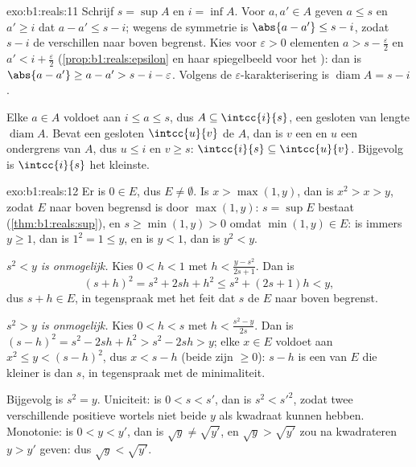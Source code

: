 \begin{solution}{exo:b1:reals:11}
Schrijf $s = \sup A$ en $i = \inf A$. Voor $a, a' \in A$ geven $a \leq s$
en $a' \geq i$ dat $a - a' \leq s - i$; wegens de symmetrie is $\abs{a -
a'} \leq s - i$, zodat $s - i$ de  verschillen naar boven
begrenst. Kies voor $\varepsilon > 0$ elementen $a > s -
\frac\varepsilon2$ en $a' < i + \frac\varepsilon2$
(\cref{prop:b1:reals:epsilon} en haar spiegelbeeld voor het ): dan
is $\abs{a - a'} \geq a - a' > s - i - \varepsilon$. Volgens de
$\varepsilon$-karakterisering is $\operatorname{diam} A = s - i$.

Elke $a \in A$ voldoet aan $i \leq a \leq s$, dus $A \subseteq
\intcc{i}{s}$, een gesloten  van lengte $\operatorname{diam} A$.
Bevat een gesloten  $\intcc{u}{v}$ de  $A$, dan is $v$
een  en $u$ een ondergrens van $A$, dus $u \leq i$ en $v \geq
s$: $\intcc{i}{s} \subseteq \intcc{u}{v}$. Bijgevolg is $\intcc{i}{s}$
het kleinste.
\end{solution}

\begin{solution}{exo:b1:reals:12}
Er is $0 \in E$, dus $E \neq \emptyset$. Is $x > \max(1, y)$, dan is $x^2
> x > y$, zodat $E$ naar boven begrensd is door $\max(1, y)$: $s = \sup
E$ bestaat (\cref{thm:b1:reals:sup}), en $s \geq \min(1, y) > 0$ omdat
$\min(1, y) \in E$: is immers $y \geq 1$, dan is $1^2 = 1 \leq y$, en is
$y < 1$, dan is $y^2 < y$.

\emph{$s^2 < y$ is onmogelijk.} Kies $0 < h < 1$ met $h < \frac{y -
s^2}{2s + 1}$. Dan is
\[
(s + h)^2 = s^2 + 2sh + h^2 \leq s^2 + (2s + 1)h < y ,
\]
dus $s + h \in E$, in tegenspraak met het feit dat $s$ de  $E$
naar boven begrenst.

\emph{$s^2 > y$ is onmogelijk.} Kies $0 < h < s$ met $h < \frac{s^2 -
y}{2s}$. Dan is $(s - h)^2 = s^2 - 2sh + h^2 > s^2 - 2sh > y$; elke $x
\in E$ voldoet aan $x^2 \leq y < (s - h)^2$, dus $x < s - h$ (beide zijn
$\geq 0$): $s - h$ is een  van $E$ die kleiner is dan $s$, in
tegenspraak met de minimaliteit.

Bijgevolg is $s^2 = y$. Uniciteit: is $0 < s < s'$, dan is $s^2 < s'^2$,
zodat twee verschillende positieve wortels niet beide $y$ als kwadraat
kunnen hebben. Monotonie: is $0 < y < y'$, dan is $\sqrt y \neq
\sqrt{y'}$, en $\sqrt y > \sqrt{y'}$ zou na kwadrateren $y > y'$ geven:
dus $\sqrt y < \sqrt{y'}$.
\end{solution}

